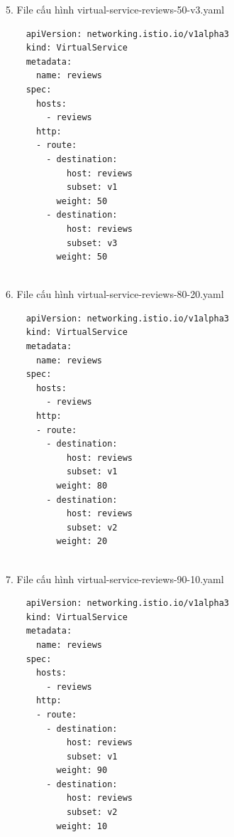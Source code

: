 \documentclass[12pt,a4paper]{report}
\begin{document}
{{\begin{lstlisting}
\end{lstlisting}

5. File cấu hình virtual-service-reviews-50-v3.yaml
\begin{lstlisting}
	apiVersion: networking.istio.io/v1alpha3
	kind: VirtualService
	metadata:
	  name: reviews
	spec:
	  hosts:
		- reviews
	  http:
	  - route:
		- destination:
			host: reviews
			subset: v1
		  weight: 50
		- destination:
			host: reviews
			subset: v3
		  weight: 50
	
\end{lstlisting}

6. File cấu hình virtual-service-reviews-80-20.yaml
\begin{lstlisting}
	apiVersion: networking.istio.io/v1alpha3
	kind: VirtualService
	metadata:
	  name: reviews
	spec:
	  hosts:
		- reviews
	  http:
	  - route:
		- destination:
			host: reviews
			subset: v1
		  weight: 80
		- destination:
			host: reviews
			subset: v2
		  weight: 20
	
\end{lstlisting}

7. File cấu hình virtual-service-reviews-90-10.yaml
\begin{lstlisting}
	apiVersion: networking.istio.io/v1alpha3
	kind: VirtualService
	metadata:
	  name: reviews
	spec:
	  hosts:
		- reviews
	  http:
	  - route:
		- destination:
			host: reviews
			subset: v1
		  weight: 90
		- destination:
			host: reviews
			subset: v2
		  weight: 10
	
\end{lstlisting}

}}
\end{document}
